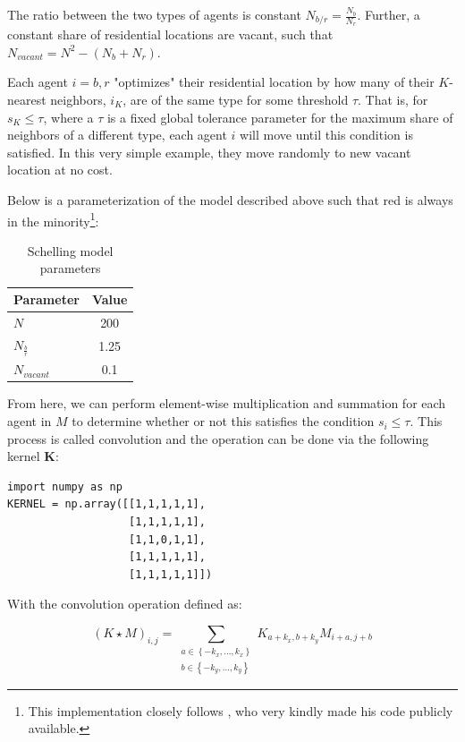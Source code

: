 \documentclass[../main.tex]{subfiles}
\begin{document}
The ratio between the two types of agents is constant $N_{b/r} = \frac{N_b}{N_r}$. Further, a constant share of residential locations are vacant, such that $N_{vacant} = N^2 - (N_b + N_r)$. 

Each agent $i = b, r$ "optimizes" their residential location by how many of their $K$-nearest neighbors, $i_K$, are of the same type for some threshold $\tau$. That is, for $s_K \leq \tau$, where a $\tau$ is a fixed global tolerance parameter for the maximum share of neighbors of a different type, each agent $i$ will move until this condition is satisfied. In this very simple example, they move randomly to new vacant location at no cost. 

Below is a parameterization of the model described above such that red is always in the minority\footnote{This implementation closely follows \textcite{luca_mingarelli}, who very kindly made his code publicly available.}:

\begin{table}[H]
    \centering
    \caption{Schelling model parameters}
    \begin{tabular}{lc}
    \toprule
      Parameter & Value \\
    \midrule
      $N$         & 200 \\
      $N_{\frac{b}{r}}$       & 1.25 \\
      $N_{vacant}$ & 0.1 \\
    \bottomrule
    \end{tabular}
\end{table}

From here, we can perform element-wise multiplication and summation for each agent in $M$ to determine whether or not this satisfies the condition $s_i \leq \tau$. This process is called convolution and the operation can be done via the following kernel $\mathbf{K}$:

\begin{lstlisting}[style=pythonstyle]
import numpy as np
KERNEL = np.array([[1,1,1,1,1],
                   [1,1,1,1,1],
                   [1,1,0,1,1],
                   [1,1,1,1,1],
                   [1,1,1,1,1]])

\end{lstlisting}

With the convolution operation defined as:

\begin{equation}
(K \star M)_{i, j}=\sum_{\substack{a \in\left\{-k_x, \ldots, k_x\right\} \\ b \in\left\{-k_y, \ldots, k_y\right\}}} K_{a+k_x, b+k_y} M_{i+a, j+b}
\label{eq:convolution}
\end{equation}
\end{document}
